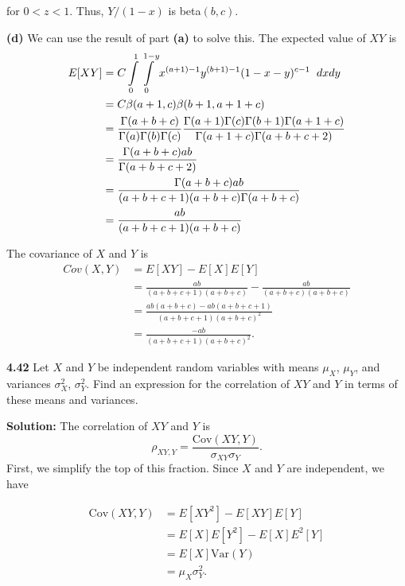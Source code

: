 \documentclass{article}
\newcommand{\mybox}{%
    \collectbox{%
        \setlength{\fboxsep}{1pt}%
        \fbox{\BOXCONTENT}%
    }%
}
\begin{document}
\noindent for $0<z<1$.  Thus, $Y/(1-x)$ is beta$(b,c)$. 

\vspace{3mm}

\noindent \textbf{(d)}  We can use the result of part \textbf{(a)} to solve this.  The expected value of $XY$ is
\begin{align}
E[XY] &= C\int\limits_0^{1}\int\limits_0^{1-y}x^{(a+1)-1}y^{(b+1)-1}(1-x-y)^{c-1} \hspace{2mm}dxdy \\
&= C\beta(a+1,c)\beta(b+1,a+1+c) \\
&= \frac{\Gamma(a+b+c)}{\Gamma(a)\Gamma(b)\Gamma(c)}\frac{\Gamma(a+1)\Gamma(c)\Gamma(b+1)\Gamma(a+1+c)}{\Gamma(a+1+c)\Gamma(a+b+c+2)} \\
&=\frac{\Gamma(a+b+c)ab}{\Gamma(a+b+c+2)} \\
&= \frac{\Gamma(a+b+c)ab}{(a+b+c+1)(a+b+c)\Gamma(a+b+c)} \\
&= \frac{ab}{(a+b+c+1)(a+b+c)}
\end{align}

\noindent The covariance of $X$ and $Y$ is
\begin{align}
Cov(X,Y) &= E[XY]-E[X]E[Y] \\
&= \frac{ab}{(a+b+c+1)(a+b+c)} - \frac{ab}{(a+b+c)(a+b+c)} \\
&= \frac{ab(a+b+c)-ab(a+b+c+1)}{(a+b+c+1)(a+b+c)^2} \\
&= \frac{-ab}{(a+b+c+1)(a+b+c)^2}.
\end{align}
\pagebreak

\noindent\mybox{\textbf{4.42}}  Let $X$ and $Y$ be independent random variables with means $\mu_X$, $\mu_Y$, and variances $\sigma_X^2$, $\sigma_Y^2$.  Find an expression for the correlation of $XY$ and $Y$ in terms of these means and variances. 

\vspace{3mm}

\noindent\mybox{\textbf{Solution:}}  The correlation of $XY$ and $Y$ is $$\rho_{XY,Y} = \frac{\text{Cov}(XY,Y)}{\sigma_{XY}\sigma_Y}.$$  First, we simplify the top of this fraction.  Since $X$ and $Y$ are independent, we have  

\begin{align}
\text{Cov}(XY, Y) &= E[XY^2] - E[XY]E[Y] \\
&= E[X]E[Y^2]-E[X]E^2[Y] \\
&= E[X]\text{Var}(Y) \\
&= \mu_X\sigma^2_Y.
\end{align}
\end{document}
